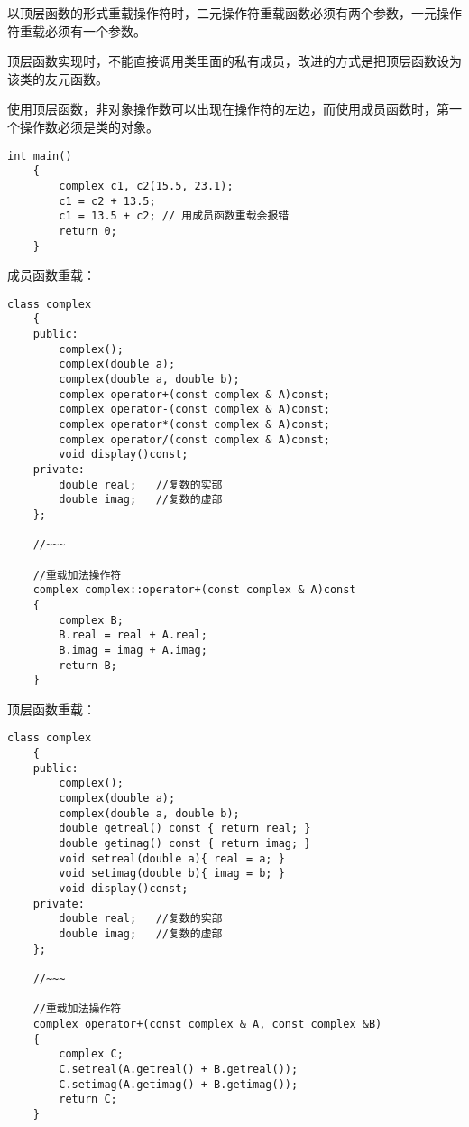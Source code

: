 以顶层函数的形式重载操作符时，二元操作符重载函数必须有两个参数，一元操作符重载必须有一个参数。

顶层函数实现时，不能直接调用类里面的私有成员，改进的方式是把顶层函数设为该类的友元函数。

使用顶层函数，非对象操作数可以出现在操作符的左边，而使用成员函数时，第一个操作数必须是类的对象。

\begin{lstlisting}[frame=shadowbox] 
    int main()
    {
        complex c1, c2(15.5, 23.1);
        c1 = c2 + 13.5;
        c1 = 13.5 + c2; // 用成员函数重载会报错
        return 0;
    }
\end{lstlisting}

\newpage

成员函数重载：
\begin{lstlisting}[frame=shadowbox]
    class complex
    {
    public:
        complex();
        complex(double a);
        complex(double a, double b);
        complex operator+(const complex & A)const;
        complex operator-(const complex & A)const;
        complex operator*(const complex & A)const;
        complex operator/(const complex & A)const;
        void display()const;
    private:
        double real;   //复数的实部
        double imag;   //复数的虚部
    };

    //~~~
    
    //重载加法操作符
    complex complex::operator+(const complex & A)const
    {
        complex B;
        B.real = real + A.real;
        B.imag = imag + A.imag;
        return B;
    }
\end{lstlisting}

\newpage

顶层函数重载：
\begin{lstlisting}[frame=shadowbox]
    class complex
    {
    public:
        complex();
        complex(double a);
        complex(double a, double b);
        double getreal() const { return real; }
        double getimag() const { return imag; }
        void setreal(double a){ real = a; }
        void setimag(double b){ imag = b; }
        void display()const;
    private:
        double real;   //复数的实部
        double imag;   //复数的虚部
    };

    //~~~
    
    //重载加法操作符
    complex operator+(const complex & A, const complex &B)
    {
        complex C;
        C.setreal(A.getreal() + B.getreal());
        C.setimag(A.getimag() + B.getimag());
        return C;
    }
\end{lstlisting}

